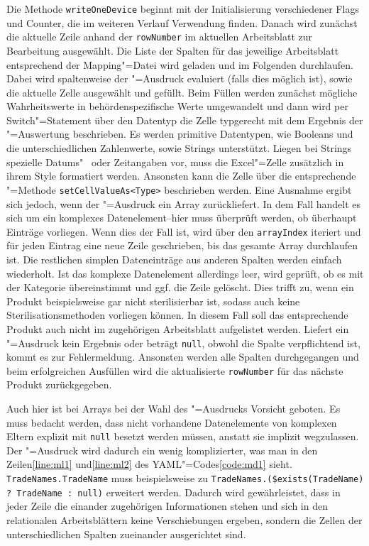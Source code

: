 Die Methode \texttt{writeOneDevice} beginnt mit der Initialisierung verschiedener Flags und Counter, die im weiteren Verlauf Verwendung finden. Danach wird zunächst die aktuelle Zeile anhand der \texttt{rowNumber} im aktuellen Arbeitsblatt zur Bearbeitung ausgewählt. 
Die Liste der Spalten für das jeweilige Arbeitsblatt entsprechend der Mapping"=Datei wird geladen und im Folgenden durchlaufen. Dabei wird spaltenweise der "=Ausdruck evaluiert (falls dies möglich ist), sowie die aktuelle Zelle ausgewählt und gefüllt. Beim Füllen werden zunächst mögliche Wahrheitswerte in behördenspezifische Werte umgewandelt und dann wird per Switch"=Statement über den Datentyp die Zelle typgerecht mit dem Ergebnis der "=Auswertung beschrieben. Es werden primitive Datentypen, wie Booleans und die unterschiedlichen Zahlenwerte, sowie Strings unterstützt. Liegen bei Strings spezielle Datums"~ oder Zeitangaben vor, muss die Excel"=Zelle zusätzlich in ihrem Style formatiert werden. Ansonsten kann die Zelle über die entsprechende "=Methode \texttt{setCellValueAs<Type>} beschrieben werden. Eine Ausnahme ergibt sich jedoch, wenn der "=Ausdruck ein Array zurückliefert. In dem Fall handelt es sich um ein komplexes Datenelement\nbs --\nbs hier muss überprüft werden, ob überhaupt Einträge vorliegen. Wenn dies der Fall ist, wird über den \texttt{arrayIndex} iteriert und für jeden Eintrag eine neue Zeile geschrieben, bis das gesamte Array durchlaufen ist. Die restlichen simplen Dateneinträge aus anderen Spalten werden einfach wiederholt. Ist das komplexe Datenelement allerdings leer, wird geprüft, ob es mit der Kategorie übereinstimmt und ggf. die Zeile gelöscht. Dies trifft zu, wenn ein Produkt beispielsweise gar nicht sterilisierbar ist, sodass auch keine Sterilisationsmethoden vorliegen können. In diesem Fall soll das entsprechende Produkt auch nicht im zugehörigen Arbeitsblatt aufgelistet werden. Liefert ein "=Ausdruck kein Ergebnis oder beträgt \texttt{null}, obwohl die Spalte verpflichtend ist, kommt es zur Fehlermeldung. Ansonsten werden alle Spalten durchgegangen und beim erfolgreichen Ausfüllen wird die aktualisierte \texttt{rowNumber} für das nächste Produkt zurückgegeben. 

Auch hier ist bei Arrays bei der Wahl des "=Ausdrucks Vorsicht geboten. Es muss bedacht werden, dass nicht vorhandene Datenelemente von komplexen Eltern explizit mit \texttt{null} besetzt werden müssen, anstatt sie implizit wegzulassen. Der "=Ausdruck wird dadurch ein wenig komplizierter, was man in den Zeilen\nbs\ref{line:ml1} und\nbs\ref{line:ml2} des YAML"=Codes\nbs\ref{code:md1} sieht. \texttt{TradeNames.TradeName} muss beispielsweise zu \texttt{TradeNames.(\$exists(TradeName) ? TradeName : null)} erweitert werden. Dadurch wird gewährleistet, dass in jeder Zeile die einander zugehörigen Informationen stehen und sich in den relationalen Arbeitsblättern keine Verschiebungen ergeben, sondern die Zellen der unterschiedlichen Spalten zueinander ausgerichtet sind. 

